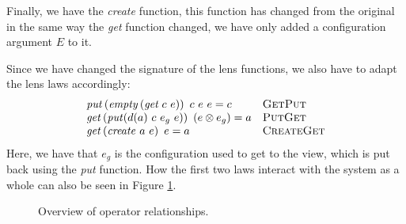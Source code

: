 Finally, we have the \emph{create} function, this function has changed from the
original in the same way the \emph{get} function changed, we have only added a
configuration argument \(E\) to it.

Since we have changed the signature of the lens functions, we also have to
adapt the lens laws accordingly:
\[
  \begin{array}{ll}
    \mathit{put}\left(\mathit{empty}\left(\textit{get}~c~e\right)\right)~c~e~e = c & \textsc{GetPut} \\
    \mathit{get}\left(\mathit{put}(d(a)~c~e_g~e)\right)~\left(e\otimes e_g\right) = a & \textsc{PutGet} \\
    \mathit{get}\left(\mathit{create}~a~e\right)~e = a & \textsc{CreateGet}
  \end{array}
\]
Here, we have that \(e_g\) is the configuration used to get to the view, which
is put back using the \emph{put} function. How the first two laws interact with
the system as a whole can also be seen in Figure \ref{fig:operator:overview}.

\begin{figure}
  \centering
  \caption{Overview of operator relationships.}
  \label{fig:operator:overview}
\end{figure}

